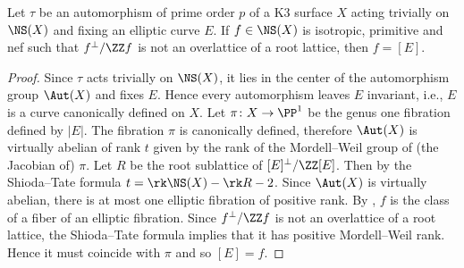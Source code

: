\begin{lemma}\label{identifyE}
 Let $\tau$ be an automorphism of prime order $p$ of a K3 surface $X$ acting trivially on $\NS(X)$ and fixing an elliptic curve $E$. If $f \in \NS(X)$ is isotropic, primitive and nef such that $f^\perp /\ZZ f$ is not an overlattice of a root lattice, then $f = [E]$.
\end{lemma}
\begin{proof}
 Since $\tau$ acts trivially on $\NS(X)$, it lies in the center of the automorphism group $\Aut(X)$ and fixes $E$. Hence every automorphism leaves $E$ invariant, i.e., $E$ is a curve canonically defined on $X$.
 Let $\pi\colon X \to \PP^1$ be the genus one fibration defined by $|E|$.
The fibration $\pi$ is canonically defined, therefore $\Aut(X)$ is virtually abelian of rank $t$ given by the rank of the Mordell--Weil group of (the Jacobian of) $\pi$.
Let $R$ be the root sublattice of $[E]^\perp/\ZZ[E]$. Then by the Shioda--Tate formula \cite[5.2]{shioda1990} $t=\rk \NS(X)-\rk R -2$. Since $\Aut(X)$ is virtually abelian, there is at most one elliptic fibration of positive rank. By \cite[\S 3]{shafarevich1972}, $f$ is the class of a fiber of an elliptic fibration. Since $f^\perp/\ZZ f$ is not an overlattice of a root lattice, the Shioda--Tate formula implies that it has positive Mordell--Weil rank. Hence it must coincide with $\pi$ and so $[E] = f$.
\end{proof}

